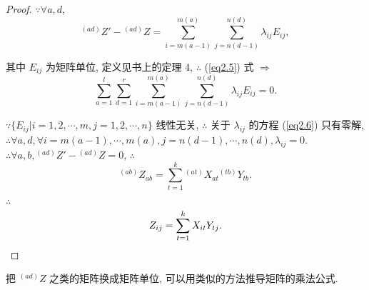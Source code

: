 \documentclass{ctexart}
\begin{document}
\begin{proof}
    $\because\forall a,d$,
    \[{}^{(ad)}Z'-{}^{(ad)}Z=\sum\limits_{i=m(a-1)}^{m(a)}\sum\limits_{j=n(d-1)}^{n(d)}\lambda_{ij}E_{ij},\]

    其中 $E_{ij}$ 为矩阵单位, 定义见书上的定理 4, $\therefore$ (\ref{eq2.5}) 式 $\Rightarrow$
    \begin{equation}\label{eq2.6}
        \sum\limits_{a=1}^{l}\sum\limits_{d=1}^{r}\sum\limits_{i=m(a-1)}^{m(a)}\sum\limits_{j=n(d-1)}^{n(d)}\lambda_{ij}E_{ij}=0.
    \end{equation}

    $\because\{E_{ij}|i=1,2,\cdots,m,j=1,2,\cdots,n\}$ 线性无关, $\therefore$ 关于 $\lambda_{ij}$ 的方程 (\ref{eq2.6}) 只有零解, $\therefore\forall a,d,\forall i=m(a-1),\cdots,m(a),j=n(d-1),\cdots,n(d),\lambda_{ij}=0$. $\therefore\forall a,b,{}^{(ad)}Z'-{}^{(ad)}Z=0$, $\therefore$
    \[^{(ab)}Z_{ab}=\sum\limits_{t=1}^k{}^{(at)}X_{at}{}^{(tb)}Y_{tb}.\]

    $\therefore$
    \[Z_{ij}=\sum\limits_{t=1}^kX_{it}Y_{tj}.\qedhere\]
\end{proof}
\begin{note}
    把 $^{(ad)}Z$ 之类的矩阵换成矩阵单位, 可以用类似的方法推导矩阵的乘法公式.
\end{note}
\end{document}
